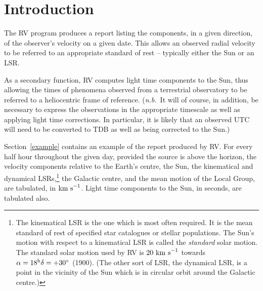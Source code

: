 \renewcommand{\thepage}{\arabic{page}}
\setcounter{page}{1}

\section{Introduction}

The RV program produces a report listing the components, in a given
direction, of the observer's velocity on a given date.  This allows an
observed radial velocity to be referred to an appropriate standard of
rest -- typically either the Sun or an LSR.

As a secondary function, RV computes light time components to the Sun,
thus allowing the times of phenomena observed from a terrestrial
observatory to be referred to a heliocentric frame of reference.
({\it n.b.}\ It will of course, in addition, be necessary to express the
observations in the appropriate timescale as well as applying light
time corrections.  In particular, it is likely that an observed UTC
will need to be converted to TDB as well as being corrected to the
Sun.)

Section~\ref{example} contains an example of the report produced by RV.
For every half hour throughout the given day, provided the source is above the
horizon, the velocity components relative to the Earth's centre, the Sun, the
kinematical and dynamical LSRs,\footnote{The kinematical LSR is the
one which is most often required.  It is the mean standard of
rest of specified star catalogues or
stellar populations.  The Sun's motion with respect to a
kinematical LSR is called the {\it standard}\/ solar motion.
The standard solar motion used by RV is
$20~{\rm km~s}^{-1}$ towards $\alpha=18^{\rm h} \delta=+30^{\circ}$
(1900). (The other sort of LSR, the dynamical LSR, is a point in the
vicinity of the Sun which is in circular orbit around the
Galactic centre.)}
the Galactic centre, and the mean motion of the Local
Group, are tabulated, in ${\rm km~s}^{-1}$.
Light time components to the Sun, in seconds, are tabulated also.

